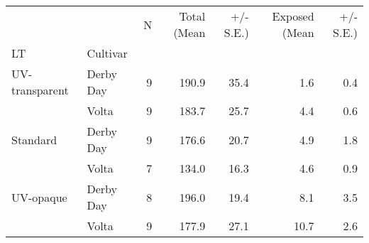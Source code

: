 \begin{tabular}{llrrrrr}
\toprule
          &       &  N &  Total (Mean &  +/- S.E.)  &  Exposed (Mean &  +/- S.E.) \\
LT & Cultivar &    &              &             &                &            \\
\midrule
UV-transparent & Derby Day &  9 &        190.9 &        35.4 &            1.6 &        0.4 \\
          & Volta &  9 &        183.7 &        25.7 &            4.4 &        0.6 \\
Standard & Derby Day &  9 &        176.6 &        20.7 &            4.9 &        1.8 \\
          & Volta &  7 &        134.0 &        16.3 &            4.6 &        0.9 \\
UV-opaque & Derby Day &  8 &        196.0 &        19.4 &            8.1 &        3.5 \\
          & Volta &  9 &        177.9 &        27.1 &           10.7 &        2.6 \\
\bottomrule
\end{tabular}
